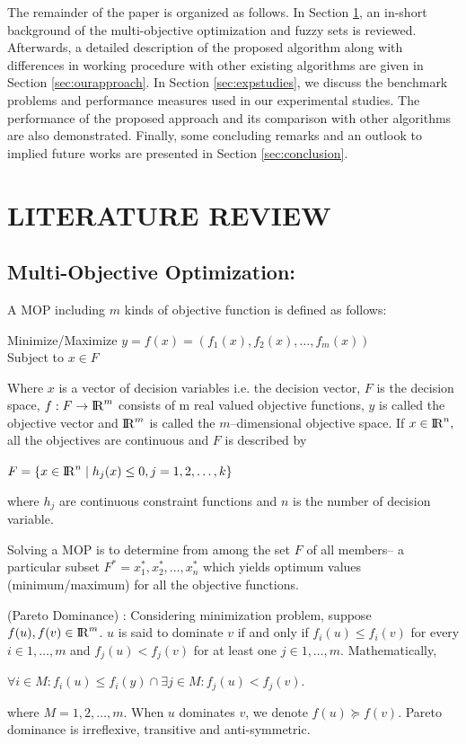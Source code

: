 \documentclass[journal]{IEEEtran}
\begin{document}
The remainder of the paper is organized as follows. In Section \ref{sec:litrev}, an in-short background of the multi-objective optimization and fuzzy sets is reviewed. Afterwards, a detailed description of the proposed algorithm along with differences in working procedure with other existing algorithms are given in Section \ref{sec:ourapproach}. In Section \ref{sec:expstudies}, we discuss the benchmark problems and performance measures used in our experimental studies. The performance of the proposed approach and its comparison with other algorithms are also demonstrated. Finally, some concluding remarks and an outlook to implied future works are presented in Section \ref{sec:conclusion}.


\section{LITERATURE REVIEW}
\label{sec:litrev}

\subsection{Multi-Objective Optimization:}
A MOP including $m$ kinds of objective function is defined as follows:
\begin{center}
Minimize/Maximize $y = f(x) = (f_1(x), f_2(x),\dots,f_m(x))$\\
Subject to $x \in F$
\end{center}

\indent Where $x$ is a vector of decision variables i.e. the decision vector, $F$ is the decision space, $f:F \rightarrow {\rm I\!R}^m$ consists of m real valued objective functions, $y$ is called the objective vector and ${\rm I\!R}^m$ is called the $m$--dimensional objective space. If $x \in {\rm I\!R}^n,$ all the objectives are continuous and $F$ is described by 
\begin{center}
$F = \{x \in {\rm I\!R}^n\mid h_j(x)\leq 0, j=1,2,\dots,k \}$
\end{center}
where $h_j$ are continuous constraint functions and $n$ is the number of decision variable.

Solving a MOP is to determine from among the set $F$ of all members-- a particular subset $F^* = {x^{*}_1, x^{*}_2,\dots,x^{*}_n}$ which yields optimum values (minimum/maximum) for all the objective functions.

\begin{definition} (Pareto Dominance) :
Considering minimization problem, suppose $f(u),f(v)\in {\rm I\!R}^m$. $u$ is said to dominate $v$ if and only if $f_i(u)\leq f_i(v)$ for every $i\in {1,\dots, m}$ and $f_j(u)<f_j(v)$ for at least one $j \in {1,\dots,m}$. Mathematically, 

\begin{center}$\forall i \in M : f_i(u) \leq f_i(y) \cap \exists j\in M : f_j(u)<f_j(v).$\end{center}

where $M = {1, 2,\dots,m}$.
When $u$ dominates $v$, we denote $f(u) \succeq f(v)$. Pareto dominance is irreflexive, transitive and anti-symmetric. 
\end{definition}
\end{document}
